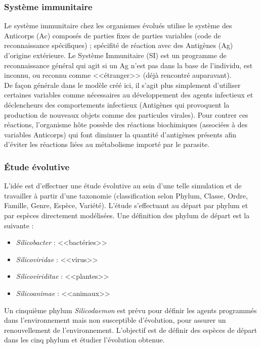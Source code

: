 \documentclass[11pt,twoside,a4paper]{article}
\begin{document}
\subsubsection{Syst{\`e}me immunitaire}

Le syst{\`e}me immunitaire chez les organismes {\'e}volu{\'e}s utilise le syst{\`e}me des Anticorps (Ac) compos{\'e}s de parties fixes de  parties variables (code de reconnaissance sp{\'e}cifiques) ; sp{\'e}cifit{\'e} de r{\'e}action avec des Antig{\`e}nes (Ag) d'origine ext{\'e}rieure. Le Syst{\`e}me Immunitaire (SI) est un programme de reconnaissance g{\'e}n{\'e}ral qui agit si un Ag n'est pas dans la base de l'individu, est inconnu, ou reconnu comme <<{\'e}tranger>> (d{\'e}j{\`a} rencontr{\'e} auparavant).~\\

De fa\c{c}on g{\'e}n{\'e}rale dans le mod{\`e}le cr{\'e}{\'e} ici, il s'agit plus simplement d'utiliser certaines variables comme n{\'e}cessaires au d{\'e}veloppement des agents infectieux et d{\'e}clencheurs des comportements infectieux (Antig{\`e}nes qui provoquent la production de nouveaux objets comme des particules virales). Pour contrer ces r{\'e}actions, l'organisme h{\^o}te poss{\`e}de des r{\'e}actions biochimiques (associ{\'e}es {\`a} des variables Anticorps) qui font diminuer la quantit{\'e} d'antig{\`e}nes pr{\'e}sents afin d'{\'e}viter les r{\'e}actions li{\'e}es au m{\'e}tabolisme import{\'e} par le parasite. 

\subsubsection{{\'E}tude {\'e}volutive}

L'id{\'e}e est d'effectuer une {\'e}tude {\'e}volutive au sein d'une telle simulation et de travailler {\`a} partir d'une taxonomie (classification selon Phylum, Classe, Ordre, Famille, Genre, Esp{\`e}ce, Vari{\'e}t{\'e}). L'{\'e}tude s'effectuant au d{\'e}part par phylum et par esp{\`e}ces directement mod{\'e}lis{\'e}es. Une d{\'e}finition des phylum de d{\'e}part est la suivante :~\\
\begin{minipage}{8cm}
\begin{itemize}
	\item \emph{Silicobacter} : <<bact{\'e}ries>>
	\item \emph{Silicoviridae} : <<virus>>
	\item \emph{Silicoviriditae} : <<plantes>>
	\item \emph{Silicoanimae} : <<animaux>>
\end{itemize}
\end{minipage}\hfill\begin{minipage}{10cm}
Un cinqui{\`e}me phylum \emph{Silicodaemon} est pr{\'e}vu pour d{\'e}finir les agents programm{\'e}s dans l'environnement mais non susceptible d'{\'e}volution, pour assurer un renouvellement de l'environnement. L'objectif est de d{\'e}finir des esp{\`e}ces de d{\'e}part dans les cinq phylum et {\'e}tudier l'{\'e}volution obtenue. 
\end{minipage}~\\
\end{document}
